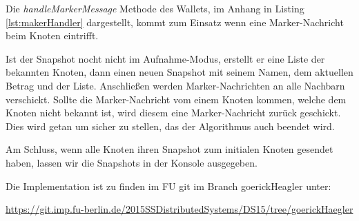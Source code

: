 Die \textit{handleMarkerMessage} Methode des Wallets, im Anhang in Listing 
\ref{lst:makerHandler} dargestellt, kommt zum Einsatz wenn eine Marker-Nachricht
beim Knoten eintrifft.

Ist der Snapshot nocht nicht im Aufnahme-Modus, erstellt er eine Liste der
bekannten Knoten, dann einen neuen Snapshot mit seinem Namen, dem aktuellen
Betrag und der Liste. Anschließen werden Marker-Nachrichten an alle Nachbarn
verschickt.
Sollte die Marker-Nachricht vom einem Knoten kommen, welche dem Knoten nicht
bekannt ist, wird diesem eine Marker-Nachricht zurück geschickt.
Dies wird getan um sicher zu stellen, das der Algorithmus auch beendet wird.

Am Schluss, wenn alle Knoten ihren Snapshot zum initialen Knoten gesendet
haben, lassen wir die Snapshots in der Konsole ausgegeben.

Die Implementation ist zu finden im FU git im Branch goerickHeagler unter:

\url{https://git.imp.fu-berlin.de/2015SSDistributedSystems/DS15/tree/goerickHaegler}